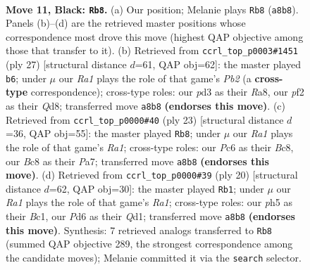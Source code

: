 \documentclass[11pt]{article}
\begin{document}
\clearpage

\begin{figure}[p]\centering
\begin{subfigure}{0.46\textwidth}\centering
\resizebox{\linewidth}{!}{%
\newchessgame
\chessboard[
  setfen={r1bq1rk1/p1p2ppp/2pp1n2/4p2P/P3P3/2PP1N2/2P2PP1/R1BQ1RK1 b - - 0 11},
  showmover=false,
  pgfstyle=straightmove, color=movearrow, markmove={a8-b8}
]}
\caption{}
\end{subfigure}\hfill
\begin{subfigure}{0.46\textwidth}\centering
\resizebox{\linewidth}{!}{%
\newchessgame
\chessboard[
  setfen={r2q1rk1/1pp3pp/3ppn2/p3p3/P3P3/3PPN1P/1PPQ2P1/R4RK1 b - - 1 14},
  showmover=false,
  pgfstyle=straightmove, color=movearrow, markmove={b7-b6}
]}
\caption{}
\end{subfigure}
\\[4pt]
\begin{subfigure}{0.46\textwidth}\centering
\resizebox{\linewidth}{!}{%
\newchessgame
\chessboard[
  setfen={r1b2rk1/p1p1qpp1/3p1n1p/P1p1p3/4P3/2PP1N1P/2P2PP1/R1BQR1K1 b - - 1 12},
  showmover=false,
  pgfstyle=straightmove, color=movearrow, markmove={a8-b8}
]}
\caption{}
\end{subfigure}\hfill
\begin{subfigure}{0.46\textwidth}\centering
\resizebox{\linewidth}{!}{%
\newchessgame
\chessboard[
  setfen={r1b2rk1/p1pnqppp/2pp4/4p3/2P1P3/3P1N1P/P1P2PP1/R1BQ1RK1 w - - 1 11},
  showmover=false,
  pgfstyle=straightmove, color=movearrow, markmove={a1-b1}
]}
\caption{}
\end{subfigure}
\caption{\textbf{Move 11, Black: \texttt{Rb8}.} (a) Our position; Melanie plays \texttt{Rb8} (\texttt{a8b8}). Panels (b)--(d) are the retrieved master positions whose correspondence most drove this move (highest QAP objective among those that transfer to it). (b) Retrieved from \texttt{ccrl\_top\_p0003\#1451} (ply 27) [structural distance $d$=61, QAP obj=62]: the master played \texttt{b6}; under $\mu$ our \emph{Ra1} plays the role of that game's \emph{Pb2} (a \textbf{cross-type} correspondence); cross-type roles: our \emph{p}d3 as their \emph{R}a8, our \emph{p}f2 as their \emph{Q}d8; transferred move \texttt{a8b8} \textbf{(endorses this move)}. (c) Retrieved from \texttt{ccrl\_top\_p0000\#40} (ply 23) [structural distance $d$=36, QAP obj=55]: the master played \texttt{Rb8}; under $\mu$ our \emph{Ra1} plays the role of that game's \emph{Ra1}; cross-type roles: our \emph{P}c6 as their \emph{B}c8, our \emph{B}c8 as their \emph{P}a7; transferred move \texttt{a8b8} \textbf{(endorses this move)}. (d) Retrieved from \texttt{ccrl\_top\_p0000\#39} (ply 20) [structural distance $d$=62, QAP obj=30]: the master played \texttt{Rb1}; under $\mu$ our \emph{Ra1} plays the role of that game's \emph{Ra1}; cross-type roles: our \emph{p}h5 as their \emph{B}c1, our \emph{P}d6 as their \emph{Q}d1; transferred move \texttt{a8b8} \textbf{(endorses this move)}. Synthesis: 7 retrieved analogs transferred to \texttt{Rb8} (summed QAP objective 289, the strongest correspondence among the candidate moves); Melanie committed it via the \texttt{search} selector.}
\label{fig:thought-m21}
\end{figure}
\end{document}
